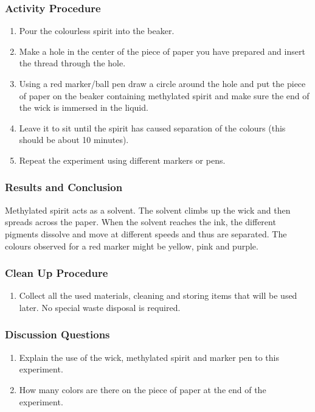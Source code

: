 \subsubsection*{Activity Procedure}
\begin{enumerate}
\item{Pour the colourless spirit into the beaker.}
\item{Make a hole in the center of the piece of paper you have prepared and insert the thread through the hole.}
\item{Using a red marker/ball pen draw a circle around the hole and put the piece of paper on the beaker containing methylated spirit and make sure the end of the wick is immersed in the liquid.}
\item{Leave it to sit until the spirit has caused separation of the colours (this should be about 10 minutes).}
\item{Repeat the experiment using different markers or pens.}
\end{enumerate}

\subsubsection*{Results and Conclusion}
Methylated spirit acts as a solvent. The solvent climbs up the wick and then spreads across the paper.  When the solvent reaches the ink, the different pigments dissolve and move at different speeds and thus are separated. The colours observed for a red marker might be yellow, pink and purple.

\subsubsection*{Clean Up Procedure}
\begin{enumerate}
\item{Collect all the used materials, cleaning and storing items that will be used later. No special waste disposal is required.}
\end{enumerate}

\subsubsection*{Discussion Questions}
\begin{enumerate}
\item{Explain the use of the wick, methylated spirit and marker pen to this experiment.}
\item{How many colors are there on the piece of paper at the end of the experiment.}
\end{enumerate}


